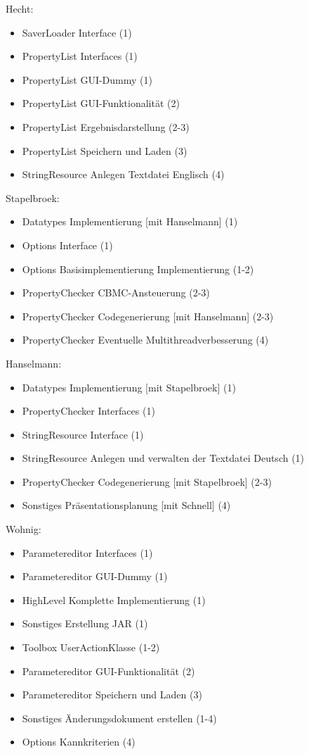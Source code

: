 \documentclass[a4paper]{scrreprt}
\begin{document}
\vspace{8mm}
Hecht: 
\begin{itemize}
\item SaverLoader Interface (1)
\item PropertyList Interfaces (1)
\item PropertyList GUI-Dummy (1)
\item PropertyList GUI-Funktionalität (2)
\item PropertyList Ergebnisdarstellung (2-3)
\item PropertyList Speichern und Laden (3)
\item StringResource Anlegen Textdatei Englisch (4)
\end{itemize} 
\vspace{8mm}
Stapelbroek:
\begin{itemize}
\item Datatypes Implementierung [mit Hanselmann] (1)
\item Options Interface (1)
\item Options Basisimplementierung Implementierung (1-2)
\item PropertyChecker CBMC-Ansteuerung (2-3) 
\item PropertyChecker Codegenerierung [mit Hanselmann] (2-3) 
\item PropertyChecker Eventuelle Multithreadverbesserung (4)
\end{itemize}
\vspace{8mm}
Hanselmann:
\begin{itemize}
\item Datatypes Implementierung [mit Stapelbroek] (1)
\item PropertyChecker Interfaces (1)
\item StringResource Interface (1)
\item StringResource Anlegen und verwalten der Textdatei Deutsch (1)
\item PropertyChecker Codegenerierung [mit Stapelbroek] (2-3)
\item Sonstiges Präsentationsplanung [mit Schnell] (4)
\end{itemize}
\vspace{8mm}
Wohnig:
\begin{itemize}
\item Parametereditor Interfaces (1)
\item Parametereditor GUI-Dummy (1)
\item HighLevel Komplette Implementierung (1)
\item Sonstiges Erstellung JAR (1)
\item Toolbox UserActionKlasse (1-2)
\item Parametereditor GUI-Funktionalität (2)
\item Parametereditor Speichern und Laden (3)
\item Sonstiges Änderungsdokument erstellen (1-4)
\item Options Kannkriterien (4)
\end{itemize}
\end{document}
